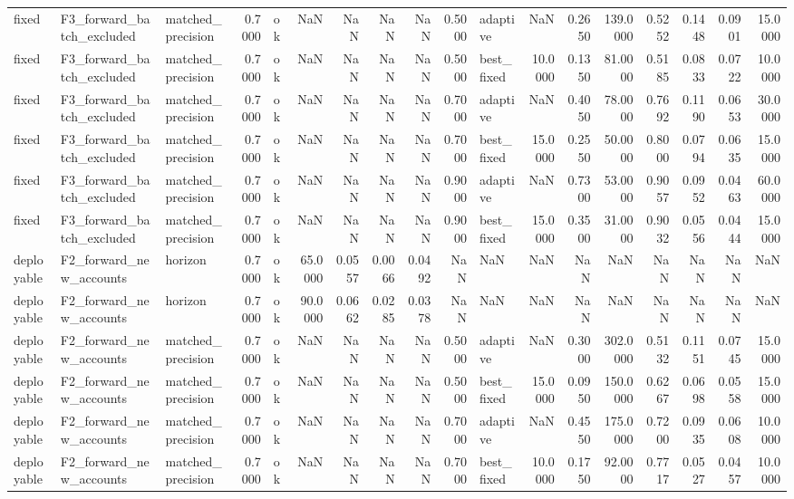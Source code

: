 \begin{table}
\begin{tabular}{lllrlrrrrrlrrrrrrr}
fixed & F3\_forward\_batch\_excluded & matched\_precision & 0.7000 & ok & NaN & NaN & NaN & NaN & 0.5000 & adaptive & NaN & 0.2650 & 139.0000 & 0.5252 & 0.1448 & 0.0901 & 15.0000 \\
fixed & F3\_forward\_batch\_excluded & matched\_precision & 0.7000 & ok & NaN & NaN & NaN & NaN & 0.5000 & best\_fixed & 10.0000 & 0.1350 & 81.0000 & 0.5185 & 0.0833 & 0.0722 & 10.0000 \\
fixed & F3\_forward\_batch\_excluded & matched\_precision & 0.7000 & ok & NaN & NaN & NaN & NaN & 0.7000 & adaptive & NaN & 0.4050 & 78.0000 & 0.7692 & 0.1190 & 0.0653 & 30.0000 \\
fixed & F3\_forward\_batch\_excluded & matched\_precision & 0.7000 & ok & NaN & NaN & NaN & NaN & 0.7000 & best\_fixed & 15.0000 & 0.2550 & 50.0000 & 0.8000 & 0.0794 & 0.0635 & 15.0000 \\
fixed & F3\_forward\_batch\_excluded & matched\_precision & 0.7000 & ok & NaN & NaN & NaN & NaN & 0.9000 & adaptive & NaN & 0.7300 & 53.0000 & 0.9057 & 0.0952 & 0.0463 & 60.0000 \\
fixed & F3\_forward\_batch\_excluded & matched\_precision & 0.7000 & ok & NaN & NaN & NaN & NaN & 0.9000 & best\_fixed & 15.0000 & 0.3500 & 31.0000 & 0.9032 & 0.0556 & 0.0444 & 15.0000 \\
deployable & F2\_forward\_new\_accounts & horizon & 0.7000 & ok & 65.0000 & 0.0557 & 0.0066 & 0.0492 & NaN & NaN & NaN & NaN & NaN & NaN & NaN & NaN & NaN \\
deployable & F2\_forward\_new\_accounts & horizon & 0.7000 & ok & 90.0000 & 0.0662 & 0.0285 & 0.0378 & NaN & NaN & NaN & NaN & NaN & NaN & NaN & NaN & NaN \\
deployable & F2\_forward\_new\_accounts & matched\_precision & 0.7000 & ok & NaN & NaN & NaN & NaN & 0.5000 & adaptive & NaN & 0.3000 & 302.0000 & 0.5132 & 0.1151 & 0.0745 & 15.0000 \\
deployable & F2\_forward\_new\_accounts & matched\_precision & 0.7000 & ok & NaN & NaN & NaN & NaN & 0.5000 & best\_fixed & 15.0000 & 0.0950 & 150.0000 & 0.6267 & 0.0698 & 0.0558 & 15.0000 \\
deployable & F2\_forward\_new\_accounts & matched\_precision & 0.7000 & ok & NaN & NaN & NaN & NaN & 0.7000 & adaptive & NaN & 0.4550 & 175.0000 & 0.7200 & 0.0935 & 0.0608 & 10.0000 \\
deployable & F2\_forward\_new\_accounts & matched\_precision & 0.7000 & ok & NaN & NaN & NaN & NaN & 0.7000 & best\_fixed & 10.0000 & 0.1750 & 92.0000 & 0.7717 & 0.0527 & 0.0457 & 10.0000 \\

\end{tabular}
\end{table}
